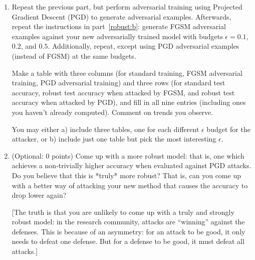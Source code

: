 \documentclass[10pt,letter,notitlepage]{article}
\newcounter{exercise}
\begin{document}
\begin{exercise}
\begin{enumerate}[label=\alph*)]
      After you adversarially trained the new model, repeat the instructions in part~\ref{robust:b} with budgets $\epsilon=0.1$, $0.2$, and $0.5$ against your new model.
      Compare the results with those from part~\ref{robust:b}, what do you observe by performing adversarial training?

		[For adversarial training, feel free to generate and use more than one adversarial example per training image.]
      \label{robust:c}

    \item Repeat the previous part, but perform adversarial training using Projected Gradient Descent (PGD) to generate adversarial examples.
      Afterwards, repeat the instructions in part~\ref{robust:b}: generate FGSM adversarial examples against your new adversarially trained model with budgets $\epsilon=0.1$, $0.2$, and $0.5$.
      Additionally, repeat, except using PGD adversarial examples (instead of FGSM) at the same budgets.

      Make a table with three columns (for standard training, FGSM adversarial training, PGD adversarial training) and three rows (for standard test accuracy, robust test accuracy when attacked by FGSM, and robust test accuracy when attacked by PGD), and fill in all nine entries (including ones you haven't already computed).
      Comment on trends you observe.

      You may either a) include three tables, one for each different $\epsilon$ budget for the attacker, or b) include just one table but pick the most interesting $\epsilon$.


  \item (Optional: 0 points) Come up with a more robust model: that is, one which achieves a non-trivially higher accuracy when evaluated against PGD attacks. Do you believe that this is *truly* more robust? That is, can you come up with a better way of attacking your new method that causes the accuracy to drop lower again?

    [The truth is that you are unlikely to come up with a truly and strongly robust model: in the research community, attacks are ``winning'' against the defenses. This is because of an asymmetry: for an attack to be good, it only needs to defeat one defense. But for a defense to be good, it must defeat all attacks.]
	\end{enumerate}

\end{exercise}
\end{document}

